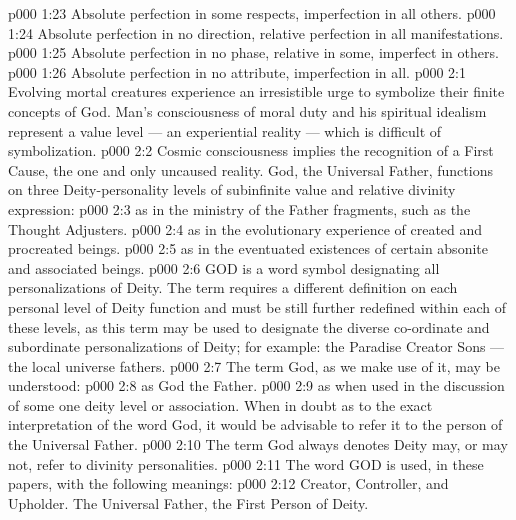 \vs p000 1:23 \bibnobreakspace Absolute perfection in some respects, imperfection in all others.
\vs p000 1:24 \bibnobreakspace Absolute perfection in no direction, relative perfection in all manifestations.
\vs p000 1:25 \bibnobreakspace Absolute perfection in no phase, relative in some, imperfect in others.
\vs p000 1:26 \bibnobreakspace Absolute perfection in no attribute, imperfection in all.
\vs p000 2:1 Evolving mortal creatures experience an irresistible urge to symbolize their finite concepts of God. Man’s consciousness of moral duty and his spiritual idealism represent a value level --- an experiential reality --- which is difficult of symbolization.
\vs p000 2:2 Cosmic consciousness implies the recognition of a First Cause, the one and only uncaused reality. God, the Universal Father, functions on three Deity\hyp{}personality levels of subinfinite value and relative divinity expression:
\vs p000 2:3 \bibnobreakspace {} as in the ministry of the Father fragments, such as the Thought Adjusters.
\vs p000 2:4 \bibnobreakspace {} as in the evolutionary experience of created and procreated beings.
\vs p000 2:5 \bibnobreakspace {} as in the eventuated existences of certain absonite and associated beings.
\vs p000 2:6 GOD is a word symbol designating all personalizations of Deity. The term requires a different definition on each personal level of Deity function and must be still further redefined within each of these levels, as this term may be used to designate the diverse co\hyp{}ordinate and subordinate personalizations of Deity; for example: the Paradise Creator Sons --- the local universe fathers.
\vs p000 2:7 \pc The term God, as we make use of it, may be understood:
\vs p000 2:8  as God the Father.
\vs p000 2:9  as when used in the discussion of some one deity level or association. When in doubt as to the exact interpretation of the word God, it would be advisable to refer it to the person of the Universal Father.
\vs p000 2:10 \pc The term God always denotes  Deity may, or may not, refer to divinity personalities.
\vs p000 2:11 \pc The word GOD is used, in these papers, with the following meanings:
\vs p000 2:12 \bibnobreakspace {} Creator, Controller, and Upholder. The Universal Father, the First Person of Deity.
